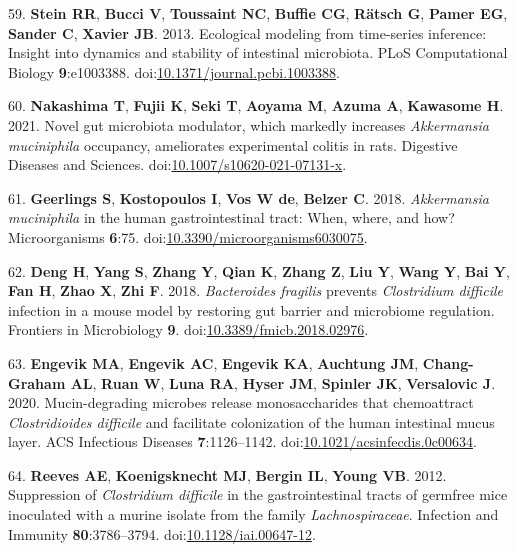 \documentclass[
  12pt,
]{article}
\newenvironment{cslreferences}%
  {}%
  {\par}
\begin{document}
\begin{cslreferences}
\leavevmode\hypertarget{ref-Stein2013}{}%
59. \textbf{Stein RR}, \textbf{Bucci V}, \textbf{Toussaint NC},
\textbf{Buffie CG}, \textbf{Rätsch G}, \textbf{Pamer EG}, \textbf{Sander
C}, \textbf{Xavier JB}. 2013. Ecological modeling from time-series
inference: Insight into dynamics and stability of intestinal microbiota.
PLoS Computational Biology \textbf{9}:e1003388.
doi:\href{https://doi.org/10.1371/journal.pcbi.1003388}{10.1371/journal.pcbi.1003388}.

\leavevmode\hypertarget{ref-Nakashima2021}{}%
60. \textbf{Nakashima T}, \textbf{Fujii K}, \textbf{Seki T},
\textbf{Aoyama M}, \textbf{Azuma A}, \textbf{Kawasome H}. 2021. Novel
gut microbiota modulator, which markedly increases \emph{Akkermansia
muciniphila} occupancy, ameliorates experimental colitis in rats.
Digestive Diseases and Sciences.
doi:\href{https://doi.org/10.1007/s10620-021-07131-x}{10.1007/s10620-021-07131-x}.

\leavevmode\hypertarget{ref-Geerlings2018}{}%
61. \textbf{Geerlings S}, \textbf{Kostopoulos I}, \textbf{Vos W de},
\textbf{Belzer C}. 2018. \emph{Akkermansia muciniphila} in the human
gastrointestinal tract: When, where, and how? Microorganisms
\textbf{6}:75.
doi:\href{https://doi.org/10.3390/microorganisms6030075}{10.3390/microorganisms6030075}.

\leavevmode\hypertarget{ref-Deng2018}{}%
62. \textbf{Deng H}, \textbf{Yang S}, \textbf{Zhang Y}, \textbf{Qian K},
\textbf{Zhang Z}, \textbf{Liu Y}, \textbf{Wang Y}, \textbf{Bai Y},
\textbf{Fan H}, \textbf{Zhao X}, \textbf{Zhi F}. 2018. \emph{Bacteroides
fragilis} prevents \emph{Clostridium difficile} infection in a mouse
model by restoring gut barrier and microbiome regulation. Frontiers in
Microbiology \textbf{9}.
doi:\href{https://doi.org/10.3389/fmicb.2018.02976}{10.3389/fmicb.2018.02976}.

\leavevmode\hypertarget{ref-Engevik2020}{}%
63. \textbf{Engevik MA}, \textbf{Engevik AC}, \textbf{Engevik KA},
\textbf{Auchtung JM}, \textbf{Chang-Graham AL}, \textbf{Ruan W},
\textbf{Luna RA}, \textbf{Hyser JM}, \textbf{Spinler JK},
\textbf{Versalovic J}. 2020. Mucin-degrading microbes release
monosaccharides that chemoattract \emph{Clostridioides difficile} and
facilitate colonization of the human intestinal mucus layer. ACS
Infectious Diseases \textbf{7}:1126--1142.
doi:\href{https://doi.org/10.1021/acsinfecdis.0c00634}{10.1021/acsinfecdis.0c00634}.

\leavevmode\hypertarget{ref-Reeves2012}{}%
64. \textbf{Reeves AE}, \textbf{Koenigsknecht MJ}, \textbf{Bergin IL},
\textbf{Young VB}. 2012. Suppression of \emph{Clostridium difficile} in
the gastrointestinal tracts of germfree mice inoculated with a murine
isolate from the family \emph{Lachnospiraceae}. Infection and Immunity
\textbf{80}:3786--3794.
doi:\href{https://doi.org/10.1128/iai.00647-12}{10.1128/iai.00647-12}.


\end{cslreferences}
\end{document}
